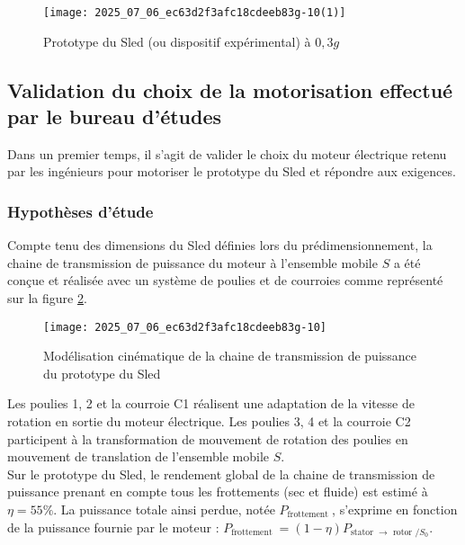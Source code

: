 \begin{figure}[!h]
\centering
\texttt{[image: 2025\_07\_06\_ec63d2f3afc18cdeeb83g-10(1)]}

\caption{\label{ccs_mp_2022_fig_13}Prototype du Sled (ou dispositif expérimental) à $0,3 g$}
\end{figure}

\subsection{Validation du choix de la motorisation effectué par le bureau d'études \label{ccs_mp_2022_sec_4A}}

\begin{obj}
Dans un premier temps, il s'agit de valider le choix du moteur électrique retenu par les ingénieurs pour motoriser le prototype du Sled et répondre aux exigences.
\end{obj}

\subsubsection*{Hypothèses d'étude}
Compte tenu des dimensions du Sled définies lors du prédimensionnement, la chaine de transmission de puissance du moteur à l'ensemble mobile $S$ a été conçue et réalisée avec un système de poulies et de courroies comme représenté sur la figure \ref{ccs_mp_2022_fig_14}.

\begin{figure}[!h]
\centering
\texttt{[image: 2025\_07\_06\_ec63d2f3afc18cdeeb83g-10]}

\caption{\label{ccs_mp_2022_fig_14}Modélisation cinématique de la chaine de transmission de puissance du prototype du Sled}
\end{figure}

Les poulies 1, 2 et la courroie C1 réalisent une adaptation de la vitesse de rotation en sortie du moteur électrique. Les poulies 3, 4 et la courroie C2 participent à la transformation de mouvement de rotation des poulies en mouvement de translation de l'ensemble mobile $S$.\\
Sur le prototype du Sled, le rendement global de la chaine de transmission de puissance prenant en compte tous les frottements (sec et fluide) est estimé à $\eta=55 \%$. La puissance totale ainsi perdue, notée $P_{\text {frottement }}$, s'exprime en fonction de la puissance fournie par le moteur : $P_{\text {frottement }}=(1-\eta) P_{\text {stator } \rightarrow \text { rotor } / S_{0}}$.

